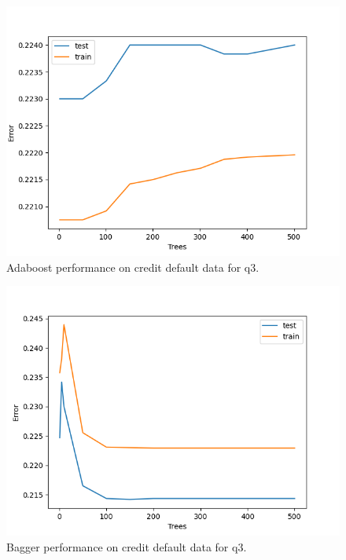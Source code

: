 \documentclass[12pt, fullpage,letterpaper]{article}
\begin{document}
\begin{enumerate}
\begin{figure}[htp]
    \centering
    \includegraphics[width=12cm]{q3_adaboost_plot.png}
    \caption{Adaboost performance on credit default data for q3.}
    \label{fig:q4a}
\end{figure}

\begin{figure}[htp]
    \centering
    \includegraphics[width=12cm]{q3_bagger_plot.png}
    \caption{Bagger performance on credit default data for q3.}
    \label{fig:q4a}
\end{figure}


\end{enumerate}
\end{document}
